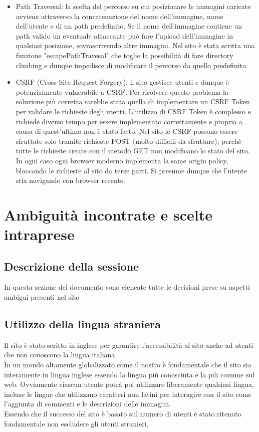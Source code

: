 \documentclass[openany, a4paper, 12pt]{report}
\begin{document}
\begin{itemize}
				\item Path Traversal: la scelta del percorso su cui posizionare le immagini caricate avviene attraverso la concatenazione del nome dell'immagine, nome dell'utente e di un path predefinito. Se il nome dell'immagine contiene un path valido un eventuale attaccante può fare l'upload dell'immagine in qualsiasi posizione, sovrascrivendo altre immagini. Nel sito è stata scritta una funzione "escapePathTravesal" che toglie la possibilità di fare directory climbing e dunque impedisce di modificare il percorso da quello predefinito.

				\item CSRF (Cross-Site Request Forgery): il sito gestisce utenti e dunque è potenzialmente vulnerabile a CSRF. Per risolvere questo problema la soluzione più corretta sarebbe stata quella di implementare un CSRF Token per validare le richieste degli utenti. L'utilizzo di CSRF Token è complesso e richiede diverso tempo per essere implementato correttamente e proprio a causa di quest'ultimo non è stato fatto. Nel sito le CSRF possono essere sfruttate solo tramite richieste POST (molto difficili da sfruttare), perchè tutte le richieste create con il metodo GET non modificano lo stato del sito.
				In ogni caso ogni browser moderno implementa la same origin policy, bloccando le richieste al sito da terze parti. Si presume dunque che l'utente stia navigando con browser recente. 
			\end{itemize}

	\chapter{Ambiguità incontrate e scelte intraprese}
		\section{Descrizione della sessione}
			In questa sezione del documento sono elencate tutte le decisioni prese su aspetti ambigui presenti nel sito\\
		\section{Utilizzo della lingua straniera}
				Il sito è stato scritto in inglese per garantire l'accessibilità al sito anche ad utenti che non conoscono la lingua italiana.\\
				In un mondo altamente globalizzato come il nostro è fondamentale che il sito sia interamente in lingua inglese essendo la lingua più conosciuta e la più comune sul web. Ovviamente ciascun utente potrà poi utilizzare liberamente qualsiasi lingua, incluse le lingue che utilizzano caratteri non latini per interagire con il sito come l'aggiunta di commenti e le descrizioni delle immagini.\\
				Essendo che il successo del sito è basato sul numero di utenti è stato ritenuto fondamentale non escludere gli utenti stranieri.
\end{document}

